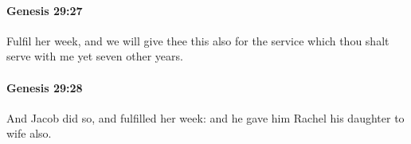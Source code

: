 		\paragraph{Genesis 29:27} %
			\label{GENESIS-29-27}

			Fulfil her week, and we will give thee this also for the service which thou shalt serve with me yet seven other years.


		\paragraph{Genesis 29:28} %
			\label{GENESIS-29-28}

			And Jacob did so, and fulfilled her week: and he gave him Rachel his daughter to wife also.


